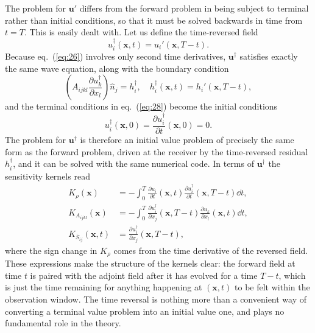 The problem for $\mathbf{u}'$ differs from the forward problem in being subject to terminal rather than initial conditions, 
so that it must be solved backwards in time from $t=T$. This is easily dealt with. Let us define the time-reversed field
\begin{equation}
u_{i}^{\dagger}(\mathbf{x},t)=u_{i}'(\mathbf{x},T-t).
\label{eq:33a}
\end{equation}
Because eq.~(\ref{eq:26}) involves only second time derivatives, $\mathbf{u}^{\dagger}$ satisfies exactly the same wave equation, 
along with the boundary condition
\begin{equation}
\left(A_{ijkl}\frac{\partial u_{k}^{\dagger}}{\partial x_{l}}\right)\hat{n}_{j}=h_{i}^{\dagger}, \quad 
h_{i}^{\dagger}(\mathbf{x},t)=h_{i}'(\mathbf{x},T-t),
\label{eq:33b}
\end{equation}
and the terminal conditions in eq.~(\ref{eq:28}) become the initial conditions
\begin{equation*}
u_{i}^{\dagger}(\mathbf{x},0)=\frac{\partial u_{i}^{\dagger}}{\partial t}(\mathbf{x},0)=0.
\end{equation*}
The problem for $\mathbf{u}^{\dagger}$ is therefore an  
initial value problem of precisely the same form as the forward problem, driven at the receiver by the time-reversed residual 
$h_{i}^{\dagger}$, and it can be solved with the same numerical code. In terms of $\mathbf{u}^{\dagger}$ the sensitivity kernels read
\begin{align}
K_{\rho}(\mathbf{x})&=-\int_{0}^{T}\frac{\partial u_{i}}{\partial t}(\mathbf{x},t)\frac{\partial u_{i}^{\dagger}}{\partial t}(\mathbf{x},T-t)\dd t, \label{eq:33c} \\
K_{A_{ijkl}}(\mathbf{x})&=-\int_{0}^{T}\frac{\partial u_{i}^{\dagger}}{\partial x_{j}}(\mathbf{x},T-t)\frac{\partial u_{k}}{\partial x_{l}}(\mathbf{x},t)\dd t, \label{eq:33d} \\
K_{\overline{S}_{ij}}(\mathbf{x},t)&= \frac{\partial u_{i}^{\dagger}}{\partial x_{j}}(\mathbf{x},T-t),
\label{eq:33e}
\end{align}
where the sign change in $K_{\rho}$ comes from the time derivative of the reversed field. These expressions make the 
structure of the kernels clear: the forward field at time $t$ is paired with the adjoint field after it has evolved for a time $T-t$, 
which is just the time remaining for anything happening at $(\mathbf{x},t)$ to be felt within the observation window. 
The time reversal is nothing more than a convenient way of converting a terminal value problem into an initial value one, and 
plays no fundamental role in the theory.


